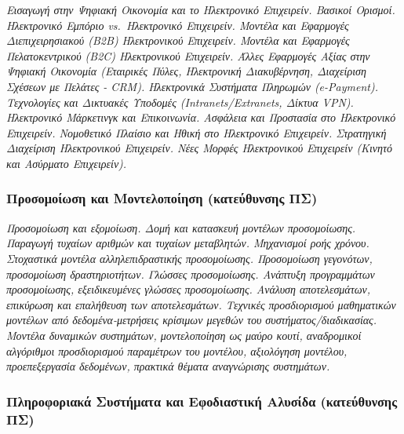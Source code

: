\emph{Εισαγωγή στην Ψηφιακή Οικονομία και το Ηλεκτρονικό Επιχειρείν.
Βασικοί Ορισμοί. Ηλεκτρονικό Εμπόριο vs.~Ηλεκτρονικό Επιχειρείν. Μοντέλα
και Εφαρμογές Διεπιχειρησιακού (B2B) Ηλεκτρονικού Επιχειρείν. Μοντέλα
και Εφαρμογές Πελατοκεντρικού (B2C) Ηλεκτρονικού Επιχειρείν. Άλλες
Εφαρμογές Αξίας στην Ψηφιακή Οικονομία (Εταιρικές Πύλες, Ηλεκτρονική
Διακυβέρνηση, Διαχείριση Σχέσεων με Πελάτες - CRM). Ηλεκτρονικά
Συστήματα Πληρωμών (e-Payment). Τεχνολογίες και Δικτυακές Υποδομές
(Intranets/Extranets, Δίκτυα VPN). Ηλεκτρονικό Μάρκετινγκ και
Επικοινωνία. Ασφάλεια και Προστασία στο Ηλεκτρονικό Επιχειρείν.
Νομοθετικό Πλαίσιο και Ηθική στο Ηλεκτρονικό Επιχειρείν. Στρατηγική
Διαχείριση Ηλεκτρονικού Επιχειρείν. Νέες Μορφές Ηλεκτρονικού Επιχειρείν
(Κινητό και Ασύρματο Επιχειρείν).}

\hypertarget{ux3c0ux3c1ux3bfux3c3ux3bfux3bcux3bfux3afux3c9ux3c3ux3b7-ux3baux3b1ux3b9-ux3bcux3bfux3bdux3c4ux3b5ux3bbux3bfux3c0ux3bfux3afux3b7ux3c3ux3b7-ux3baux3b1ux3c4ux3b5ux3cdux3b8ux3c5ux3bdux3c3ux3b7ux3c2-ux3c0ux3c3}{%
\subsubsection{Προσομοίωση και Μοντελοποίηση (κατεύθυνσης
ΠΣ)}\label{ux3c0ux3c1ux3bfux3c3ux3bfux3bcux3bfux3afux3c9ux3c3ux3b7-ux3baux3b1ux3b9-ux3bcux3bfux3bdux3c4ux3b5ux3bbux3bfux3c0ux3bfux3afux3b7ux3c3ux3b7-ux3baux3b1ux3c4ux3b5ux3cdux3b8ux3c5ux3bdux3c3ux3b7ux3c2-ux3c0ux3c3}}

\emph{Προσομοίωση και εξομοίωση. Δομή και κατασκευή μοντέλων
προσομοίωσης. Παραγωγή τυχαίων αριθμών και τυχαίων μεταβλητών.
Μηχανισμοί ροής χρόνου. Στοχαστικά μοντέλα αλληλεπιδραστικής
προσομοίωσης. Προσομοίωση γεγονότων, προσομοίωση δραστηριοτήτων. Γλώσσες
προσομοίωσης. Ανάπτυξη προγραμμάτων προσομοίωσης, εξειδικευμένες γλώσσες
προσομοίωσης. Ανάλυση αποτελεσμάτων, επικύρωση και επαλήθευση των
αποτελεσμάτων. Τεχνικές προσδιορισμού μαθηματικών μοντέλων από
δεδομένα-μετρήσεις κρίσιμων μεγεθών του συστήματος/διαδικασίας. Μοντέλα
δυναμικών συστημάτων, μοντελοποίηση ως μαύρο κουτί, αναδρομικοί
αλγόριθμοι προσδιορισμού παραμέτρων του μοντέλου, αξιολόγηση μοντέλου,
προεπεξεργασία δεδομένων, πρακτικά θέματα αναγνώρισης συστημάτων.}

\hypertarget{ux3c0ux3bbux3b7ux3c1ux3bfux3c6ux3bfux3c1ux3b9ux3b1ux3baux3ac-ux3c3ux3c5ux3c3ux3c4ux3aeux3bcux3b1ux3c4ux3b1-ux3baux3b1ux3b9-ux3b5ux3c6ux3bfux3b4ux3b9ux3b1ux3c3ux3c4ux3b9ux3baux3ae-ux3b1ux3bbux3c5ux3c3ux3afux3b4ux3b1-ux3baux3b1ux3c4ux3b5ux3cdux3b8ux3c5ux3bdux3c3ux3b7ux3c2-ux3c0ux3c3}{%
\subsubsection{Πληροφοριακά Συστήματα και Εφοδιαστική Αλυσίδα
(κατεύθυνσης
ΠΣ)}\label{ux3c0ux3bbux3b7ux3c1ux3bfux3c6ux3bfux3c1ux3b9ux3b1ux3baux3ac-ux3c3ux3c5ux3c3ux3c4ux3aeux3bcux3b1ux3c4ux3b1-ux3baux3b1ux3b9-ux3b5ux3c6ux3bfux3b4ux3b9ux3b1ux3c3ux3c4ux3b9ux3baux3ae-ux3b1ux3bbux3c5ux3c3ux3afux3b4ux3b1-ux3baux3b1ux3c4ux3b5ux3cdux3b8ux3c5ux3bdux3c3ux3b7ux3c2-ux3c0ux3c3}}

